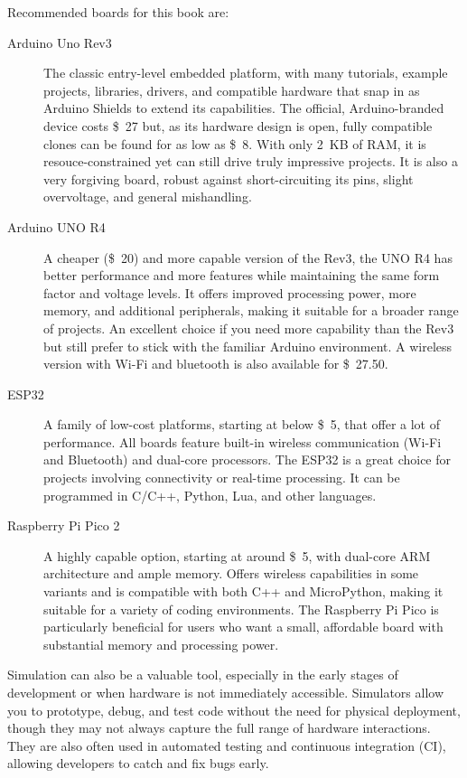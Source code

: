 Recommended boards for this book are:
\begin{description}
\item[Arduino Uno Rev3]
  The classic entry-level embedded platform, with many tutorials, example projects, libraries, drivers, and compatible hardware that snap in as Arduino Shields to extend its capabilities.
  The official, Arduino-branded device costs \SI{27}[\$]{} but, as its hardware design is open, fully compatible clones can be found for as low as \SI{8}[\$]{}.
  With only \SI{2}{KB} of RAM, it is resouce-constrained yet can still drive truly impressive projects.
  It is also a very forgiving board, robust against short-circuiting its pins, slight overvoltage, and general mishandling.
\item[Arduino UNO R4]
  A cheaper (\SI{20}[\$]{}) and more capable version of the Rev3, the UNO R4 has better performance and more features while maintaining the same form factor and voltage levels.
  It offers improved processing power, more memory, and additional peripherals, making it suitable for a broader range of projects.
  An excellent choice if you need more capability than the Rev3 but still prefer to stick with the familiar Arduino environment.
  A wireless version with Wi-Fi and bluetooth is also available for \SI{27.50}[\$]{}.
\item[ESP32]
  A family of low-cost platforms, starting at below \SI{5}[\$]{}, that offer a lot of performance.
  All boards feature built-in wireless communication (Wi-Fi and Bluetooth) and dual-core processors.
  The ESP32 is a great choice for projects involving connectivity or real-time processing.
  It can be programmed in C/C++, Python, Lua, and other languages.
\item[Raspberry Pi Pico 2]
  A highly capable option, starting at around \SI{5}[\$]{}, with dual-core ARM architecture and ample memory.
  Offers wireless capabilities in some variants and is compatible with both C++ and MicroPython, making it suitable for a variety of coding environments.
  The Raspberry Pi Pico is particularly beneficial for users who want a small, affordable board with substantial memory and processing power.
\end{description}

Simulation can also be a valuable tool, especially in the early stages of development or when hardware is not immediately accessible.
Simulators allow you to prototype, debug, and test code without the need for physical deployment, though they may not always capture the full range of hardware interactions.
They are also often used in automated testing and continuous integration (CI), allowing developers to catch and fix bugs early.


